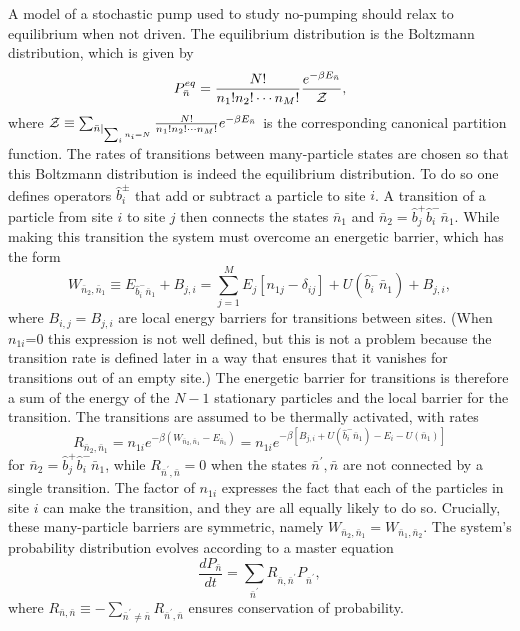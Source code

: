 \documentclass[aps,pre,showpacs,amsmath,amssymb,amsfonts,superscriptaddress,onecolumn,longbibliography]{revtex4-1}
\begin{document}
A model of a stochastic pump used to study no-pumping should relax to equilibrium when not driven. The
equilibrium distribution is the Boltzmann distribution, which is given by
\begin{equation}
\label{eq:boltzmann}
  P_{\bar{n}}^{eq} =\frac{N!}{n_1! n_2! \cdots n_M!} \frac{e^{-\beta E_{\bar{n}}}}{\cal Z},
\end{equation}
where ${\cal Z} \equiv \sum_{\bar{n}|_{\sum_i n_i = N}}\frac{N!}{n_1! n_2! \cdots n_M!} e^{-\beta E_{\bar{n}}}$ is the corresponding canonical partition function.
The rates of transitions between many-particle states are chosen so that this Boltzmann distribution
is indeed the equilibrium distribution. To do so one defines operators $\hat{b}_i^\pm$ that
add or subtract a particle to site $i$. A transition of a particle from site
$i$ to site $j$ then connects the states $\bar{n}_1$ and $\bar{n}_2=\hat{b}_j^+ \hat{b}_i^- \bar{n}_1$.
While making this transition the system must overcome an energetic barrier, which has the form
\begin{equation}
\label{eq:defmbbarrier}
W_{\bar{n}_2, \bar{n}_1} \equiv E_{\hat{b}_i^- \bar{n}_1} +B_{j,i}= \sum_{j=1}^M E_j  \left[n_{1j}-\delta_{ij} \right]+U(\hat{b}_i^- \bar{n}_1) +B_{j,i},
\end{equation}
where $B_{i,j}=B_{j,i}$ are local energy barriers for transitions between sites.
(When $n_{1i}$=0 this expression is not well defined, but this is not a problem because the transition rate is defined later in a way that
ensures that it vanishes for transitions out of an empty site.)
The energetic barrier for transitions is therefore a sum of the energy of the $N-1$
stationary particles and the local barrier for the transition.
The transitions are assumed to be thermally activated, with rates
\begin{equation}
\label{eq:defrates}
R_{\bar{n}_2, \bar{n}_1} = n_{1i} e^{-\beta \left(W_{\bar{n}_2, \bar{n}_1}- E_{\bar{n}_1}\right)}=n_{1i} e^{-\beta \left[B_{j,i}+ U(\hat{b}_i^-\bar{n}_1)-E_i-U(\bar{n}_1) \right]}
\end{equation}
for $\bar{n}_2=\hat{b}_j^+ \hat{b}_i^- \bar{n}_1$, while $R_{\bar{n}^\prime, \bar{n}}=0$ when the states $\bar{n}^\prime, \bar{n}$ are not
connected by a single transition.
The factor of $n_{1i}$ expresses the fact that each of the particles in site $i$ can make the transition, and
they are all equally likely to do so. Crucially, these many-particle barriers are symmetric, namely $W_{\bar{n}_2, \bar{n}_1}=W_{\bar{n}_1, \bar{n}_2}$.
The system's probability distribution evolves according to a master equation
\begin{equation}\label{eq:master}
  \frac{d P_{\bar{n}}}{dt}=\sum_{{\bar{n}}^\prime} R_{\bar{n}, \bar{n}^\prime}  P_{\bar{n}^\prime},
\end{equation}
where $R_{\bar{n}, \bar{n}} \equiv - \sum_{{\bar{n}}^\prime \ne \bar{n}} R_{\bar{n}^\prime, \bar{n}}$ ensures conservation of probability.
\end{document}
